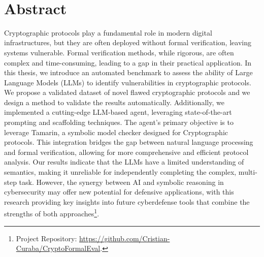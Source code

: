 \documentclass[a4paper,12pt,twoside,openany]{book}
\begin{document}
\restoregeometry
\newpage
\clearpage
\thispagestyle{empty}
\
\newpage

\chapter*{Abstract}
\thispagestyle{empty}
  Cryptographic protocols play a fundamental role in modern digital infrastructures, but they are often deployed without formal verification, leaving systems vulnerable. Formal verification methods, while rigorous, are often complex and time-consuming, leading to a gap in their practical application. In this thesis, we introduce an automated benchmark to assess the ability of Large Language Models (LLMs) to identify vulnerabilities in cryptographic protocols. We propose a validated dataset of novel flawed cryptographic protocols and we design a method to validate the results automatically. Additionally, we implemented a cutting-edge LLM-based agent, leveraging state-of-the-art prompting and scaffolding techniques. The agent's primary objective is to leverage Tamarin, a symbolic model checker designed for Cryptographic protocols. This integration bridges the gap between natural language processing and formal verification, allowing for more comprehensive and efficient protocol analysis. Our results indicate that the LLMs have a limited understanding of semantics, making it unreliable for independently completing the complex, multi-step task. However, the synergy between AI and symbolic reasoning in cybersecurity may offer new potential for defensive applications, with this research providing key insights into future cyberdefense tools that combine the strengths of both approaches\footnote{Project Repository: \url{https://github.com/Cristian-Curaba/CryptoFormalEval}.}.

\newpage
\end{document}
